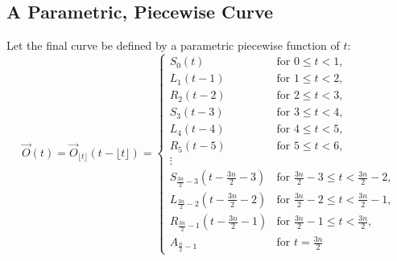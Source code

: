 \documentclass{article}
\begin{document}
\subsection{A Parametric, Piecewise Curve}
Let the final curve be defined by a parametric piecewise function of $t$:
\[
\overrightarrow{O}(t) = \overrightarrow{O}_{\lfloor t \rfloor}(t - \lfloor t \rfloor) = \begin{cases}
S_0(t) & \text{for } 0 \leq t < 1, \\
L_1(t - 1) & \text{for } 1 \leq t < 2, \\
R_2(t - 2) & \text{for } 2 \leq t < 3, \\
S_3(t - 3) & \text{for } 3 \leq t < 4, \\
L_4(t - 4) & \text{for } 4 \leq t < 5, \\
R_5(t - 5) & \text{for } 5 \leq t < 6, \\
\vdots & \\
S_{\frac{3n}{2}-3}(t - \frac{3n}{2}-3) & \text{for } \frac{3n}{2}-3 \leq t < \frac{3n}{2}-2, \\
L_{\frac{3n}{2}-2}(t - \frac{3n}{2}-2) & \text{for } \frac{3n}{2}-2 \leq t < \frac{3n}{2}-1, \\
R_{\frac{3n}{2}-1}(t - \frac{3n}{2}-1) & \text{for } \frac{3n}{2}-1 \leq t < \frac{3n}{2}, \\
A_{\frac{n}{2}-1} & \text{for } t = \frac{3n}{2}
\end{cases}
\]
\end{document}
